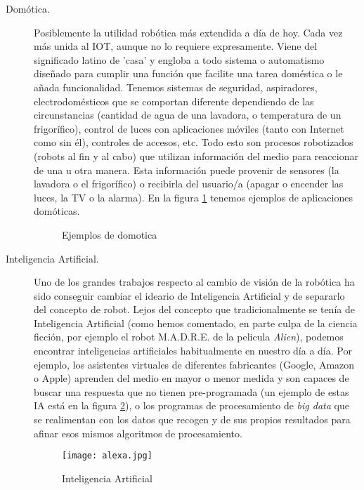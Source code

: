\begin{description}
	\item [Domótica.] Posiblemente la utilidad robótica más extendida a día de hoy. Cada vez más unida al IOT, aunque no lo requiere expresamente. Viene del significado latino de 'casa' y engloba a todo sistema o automatismo diseñado para cumplir una función que facilite una tarea doméstica o le añada funcionalidad. Tenemos sistemas de seguridad, aspiradores, electrodomésticos que se comportan diferente dependiendo de las circunstancias (cantidad de agua de una lavadora, o temperatura de un frigorífico), control de luces con aplicaciones móviles (tanto con Internet como sin él), controles de accesos, etc. Todo esto son procesos robotizados (robots al fin y al cabo) que utilizan información del medio para reaccionar de una u otra manera. Esta información puede provenir de sensores (la lavadora o el frigorífico) o recibirla del usuario/a (apagar o encender las luces, la TV o la alarma). En la figura \ref{img:domotica} tenemos ejemplos de aplicaciones domóticas.
	\begin{figure}[h]
		\centering
		\begin{subfigure}
			[Robot aspirador] {
				\texttt{[image: domotica1.jpg]}
				\label{img:domo1}}
		\end{subfigure}
		\begin{subfigure}
			[Elementos para control inteligente de luces] {
				\texttt{[image: domotica2.jpg]}
				\label{img:domo2}}
		\end{subfigure}
		\caption{Ejemplos de domotica}
		\label{img:domotica}
	\end{figure}
	\item [Inteligencia Artificial.] Uno de los grandes trabajos respecto al cambio de visión de la robótica ha sido conseguir cambiar el ideario de Inteligencia Artificial y de separarlo del concepto de robot. Lejos del concepto que tradicionalmente se tenía de Inteligencia Artificial (como hemos comentado, en parte culpa de la ciencia ficción, por ejemplo el robot M.A.D.R.E. de la pelicula \textit{Alien}), podemos encontrar inteligencias artificiales habitualmente en nuestro día a día. Por ejemplo, los asistentes virtuales de diferentes fabricantes (Google, Amazon o Apple) aprenden del medio en mayor o menor medida y son capaces de buscar una respuesta que no tienen pre-programada (un ejemplo de estas IA está en la figura \ref{img:alexa}), o los programas de procesamiento de \textit{big data} que se realimentan con los datos que recogen y de sus propios resultados para afinar esos mismos algoritmos de procesamiento.
	\begin{figure}[h]
		\centering
		\texttt{[image: alexa.jpg]}
		\caption{Inteligencia Artificial}
		\label{img:alexa}
	\end{figure}
	

\end{description}
